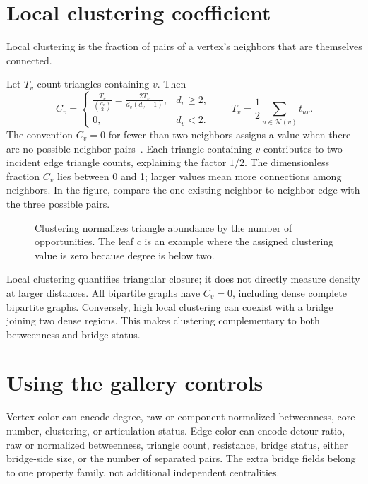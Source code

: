 \documentclass[11pt]{article}
\newcommand{\N}{\mathcal N}
\newcommand{\plain}[1]{\noindent #1\par\smallskip}
\begin{document}
\section{Local clustering coefficient}\label{sec:cluster}
\plain{Local clustering is the fraction of pairs of a vertex's neighbors that are themselves connected.}
Let $T_v$ count triangles containing $v$. Then
\begin{equation}
 C_v=\begin{cases}\displaystyle\frac{T_v}{\binom{d_v}{2}}
 =\frac{2T_v}{d_v(d_v-1)},&d_v\geq2,\\0,&d_v<2.
 \end{cases}
 \qquad T_v=\frac12\sum_{u\in\N(v)}t_{uv}.
\end{equation}
The convention $C_v=0$ for fewer than two neighbors assigns a value when there are no possible neighbor pairs~\cite{nxcluster}. Each triangle containing $v$ contributes to two incident edge triangle counts, explaining the factor $1/2$. The dimensionless fraction $C_v$ lies between 0 and 1; larger values mean more connections among neighbors. In the figure, compare the one existing neighbor-to-neighbor edge with the three possible pairs.
\par
\begin{figure}[H]\centering
{}
\caption{Clustering normalizes triangle abundance by the number of opportunities. The leaf $c$ is an example where the assigned clustering value is zero because degree is below two.}
\end{figure}
\par
Local clustering quantifies triangular closure; it does not directly measure density at larger distances. All bipartite graphs have $C_v=0$, including dense complete bipartite graphs. Conversely, high local clustering can coexist with a bridge joining two dense regions. This makes clustering complementary to both betweenness and bridge status.

\clearpage
\section{Using the gallery controls}
Vertex color can encode degree, raw or component-normalized betweenness, core number, clustering, or articulation status. Edge color can encode detour ratio, raw or normalized betweenness, triangle count, resistance, bridge status, either bridge-side size, or the number of separated pairs. The extra bridge fields belong to one property family, not additional independent centralities.
\end{document}
